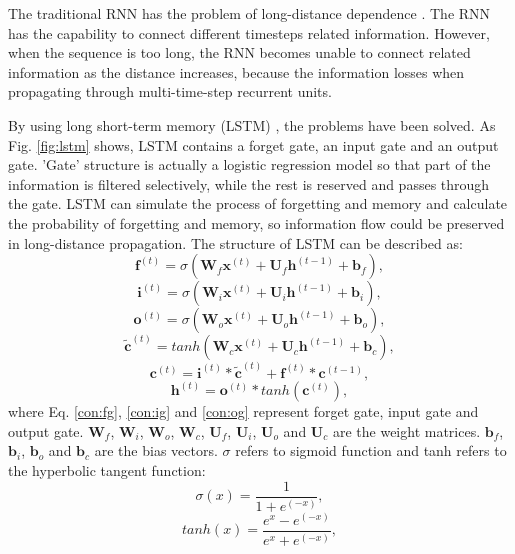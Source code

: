 \documentclass[conference]{IEEEtran}
\begin{document}
The traditional RNN has the problem of long-distance dependence
\cite{bengio1994learning}. The RNN has the capability to connect different timesteps
related information. However, when the sequence is too long, the RNN becomes unable to
connect related information as the distance increases, because the information losses
when propagating through multi-time-step recurrent units.

By using long short-term memory (LSTM) \cite{hochreiter1997long}, the problems have
been solved. As Fig. \ref{fig:lstm} shows, LSTM contains a forget gate, an input gate
and an output gate. 'Gate' structure is actually a logistic regression model so that
part of the information is filtered selectively, while the rest is reserved and passes
through the gate. LSTM can simulate the process of forgetting and memory and calculate
the probability of forgetting and memory, so information flow could be preserved in
long-distance propagation. The structure of LSTM can be described as:
\begin{equation}
    \mathbf{f}^{(t)}= \sigma (\mathbf{W}_f\mathbf{x}^{(t)}+\mathbf{U}_f\mathbf{h}^{(t-1)}+\mathbf{b}_f) ,
    \label{con:fg}
\end{equation}
\begin{equation}
    \mathbf{i}^{(t)}= \sigma (\mathbf{W}_i\mathbf{x}^{(t)}+\mathbf{U}_i\mathbf{h}^{(t-1)}+\mathbf{b}_i) ,
    \label{con:ig}
\end{equation}
\begin{equation}
    \mathbf{o}^{(t)}= \sigma (\mathbf{W}_o\mathbf{x}^{(t)}+\mathbf{U}_o\mathbf{h}^{(t-1)}+\mathbf{b}_o) ,
    \label{con:og}
\end{equation}
\begin{equation}
    \tilde{\mathbf{c}}^{(t)}= tanh (\mathbf{W}_c\mathbf{x}^{(t)}+\mathbf{U}_c\mathbf{h}^{(t-1)}+\mathbf{b}_c) ,
\end{equation}
\begin{equation}
    \mathbf{c}^{(t)} = \mathbf{i}^{(t)} * \tilde{\mathbf{c}}^{(t)} + \mathbf{f}^{(t)} * \mathbf{c}^{(t-1)} ,
\end{equation}
\begin{equation}
    \mathbf{h}^{(t)}= \mathbf{o}^{(t)} * tanh(\mathbf{c}^{(t)}),
\end{equation}
where Eq. \eqref{con:fg}, \eqref{con:ig} and \eqref{con:og} represent forget gate,
input gate and output gate.
$\mathbf{W}_f$, $\mathbf{W}_i$, $\mathbf{W}_o$, $\mathbf{W}_c$, $\mathbf{U}_f$,
$\mathbf{U}_i$, $\mathbf{U}_o$ and $\mathbf{U}_c$ are the weight matrices.
$\mathbf{b}_f$, $\mathbf{b}_i$, $\mathbf{b}_o$ and $\mathbf{b}_c$ are the bias vectors.
$\sigma$ refers to sigmoid function and tanh refers to the hyperbolic tangent function:
\begin{equation}
    \sigma(x)=\frac{1}{1+e^(-x)} ,
\end{equation}
\begin{equation}
    tanh(x)=\frac{e^x-e^(-x)}{e^x+e^(-x)} ,
\end{equation}
\end{document}
